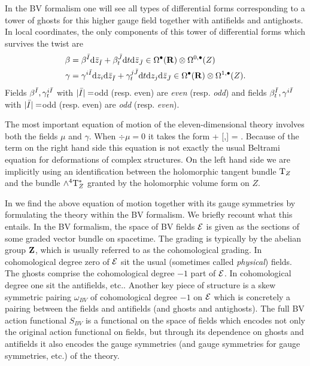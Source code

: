 \documentclass[../main.tex]{subfiles}
\begin{document}
In the BV formalism one will see all types of differential forms corresponding to a tower of ghosts for this higher gauge field together with antifields and antighosts.
In local coordinates, the only components of this tower of differential forms which survives the twist are
\begin{align*}
\beta & = \beta^{\Bar{I}} \mathrm{d} \bar{z}_{\Bar{I}} + \beta_t^{\Bar{J}} \mathrm{d} t \mathrm{d} \bar{z}_{\Bar{J}} \in \Omega^{\bullet}(\mathbf{R}) \otimes \Omega^{0,\bullet}(Z) \\
\gamma & = \gamma^{i \Bar{I}} \mathrm{d} z_i \mathrm{d} \bar{z}_{\Bar{I}} + \gamma_t^{j \Bar{J}} \mathrm{d} t \mathrm{d} z_j \mathrm{d} \bar{z}_{\Bar{J}} \in \Omega^{\bullet} (\mathbf{R}) \otimes \Omega^{1,\bullet}(Z).
\end{align*}
Fields $\beta^{\Bar{I}}, \gamma_t^{i \Bar{I}}$ with $|\Bar{I}| = $odd (resp. even) are {\em even} (resp. {\em odd}) and fields $\beta_t^{\Bar{I}}, \gamma^{i \Bar{I}}$ with $|\Bar{I}| = $odd (resp. even) are {\em odd} (resp. {\em even}). 

The most important equation of motion of the eleven-dimensional theory involves both the fields $\mu$ and $\gamma$. 
When $\div \mu = 0$ it takes the form
\beqn\label{eqn:eom2}
\dbar \mu +  [\mu,\mu] = \del \gamma \del \gamma .
\eeqn
Because of the term on the right hand side this equation is not exactly the usual Beltrami equation for deformations of complex structures.
On the left hand side we are implicitly using an identification between the holomorphic tangent bundle ${\mathrm{T}}_Z$ and the bundle $\wedge^4 {\mathrm{T}}^*_Z$ granted by the holomorphic volume form on $Z$.

In \cite{RSW} we find the above equation of motion together with its gauge symmetries by formulating the theory within the BV formalism.
We briefly recount what this entails.
In the BV formalism, the space of BV fields $\mathcal E$ is given as the sections of some graded vector bundle on spacetime. 
The grading is typically by the abelian group $\mathbf{Z}$, which is usually referred to as the cohomological grading.
In cohomological degree zero of $\mathcal E$ sit the usual (sometimes called {\em physical}) fields.
The ghosts comprise the cohomological degree $-1$ part of $\mathcal E$. 
In cohomological degree one sit the antifields, etc..
Another key piece of structure is a skew symmetric pairing $\omega_{BV}$ of cohomological degree $-1$ on $\mathcal E$ which is concretely a pairing between the fields and antifields (and ghosts and antighosts).
The full BV action functional $S_{BV}$ is a functional on the space of fields which encodes not only the original action functional on fields, but through its dependence on ghosts and antifields it also encodes the gauge symmetries (and gauge symmetries for gauge symmetries, etc.) of the theory. 
\end{document}
